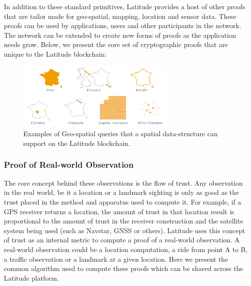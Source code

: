 %

In addition to these standard primitives, Latitude provides a host of other proofs that are tailor made
for geo-spatial, mapping, location and sensor data. These proofs can be used by applications, users and
other participants in the network. The network can be extended to create new forms of proofs as the application needs
grow. Below, we present the core set of cryptographic proofs that are unique to the Latitude blockchain:

\begin{figure}[t]
    \centering
    \includegraphics[width=0.70\textwidth]{geospatial_query.png}
  \caption{Examples of Geo-spatial queries that a spatial data-structure can support on the Latitude blockchain.}
    \label{fig:geo_spatial_query}
\end{figure}

\subsubsection{Proof of Real-world Observation}

The core concept behind these observations is the flow of trust. Any observation in the real world, be it a location or
a landmark sighting is only as good as the trust placed in the method and apparatus used to compute it. For example, if
a GPS receiver returns a location, the amount of trust in that location result is proportional to the amount of trust in
the receiver construction and the satellite system being used (such as Navstar, GNSS or others). Latitude uses this
concept of trust as an internal metric to compute a proof of a real-world observation. A real-world observation could be
a location computation, a ride from point A to B, a traffic observation or a landmark at a given location. Here we
present the common algorithm used to compute these proofs which can be shared across the Latitude platform.

